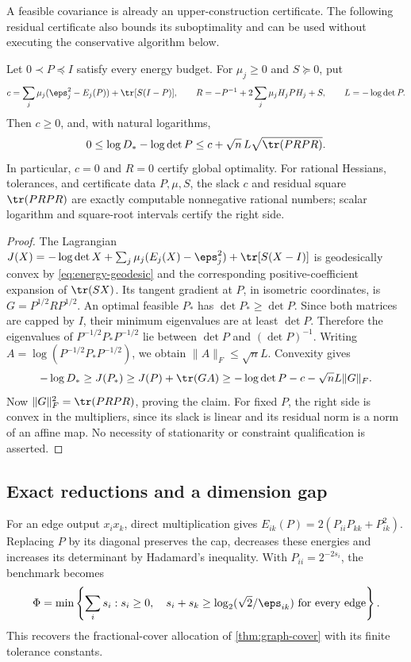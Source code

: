 A feasible covariance is already an upper-construction certificate.
The following residual certificate also bounds its suboptimality and can
be used without executing the conservative algorithm below.
\begin{proposition}\label{prop:covariance-certificate}
Let $0\prec P\preceq I$ satisfy every energy budget. For $\mu_j\ge0$
and $S\succeq0$, put
\[
 c=\sum_j\mu_j(\eps_j^2-E_j(P))+\tr[S(I-P)],\qquad
 R=-P^{-1}+2\sum_j\mu_jH_jPH_j+S,\qquad L=-\log\det P.
\]
Then $c\ge0$, and, with natural logarithms,
\begin{equation}\label{eq:covariance-certificate}
 0\le\log D_* -\log\det P
 \le c+\sqrt n\,L\sqrt{\tr(PRPR)}.
\end{equation}
In particular, $c=0$ and $R=0$ certify global optimality. For rational
Hessians, tolerances, and certificate data $P,\mu,S$, the slack $c$ and
residual square $\tr(PRPR)$ are exactly computable nonnegative rational
numbers; scalar logarithm and square-root intervals certify the right side.
\end{proposition}
\begin{proof}
The Lagrangian
$J(X)=-\log\det X+\sum_j\mu_j(E_j(X)-\eps_j^2)+\tr[S(X-I)]$
is geodesically convex by \eqref{eq:energy-geodesic} and the corresponding
positive-coefficient expansion of $\tr(SX)$. Its tangent gradient at $P$,
in isometric coordinates, is $G=P^{1/2}RP^{1/2}$. An optimal feasible
$P_*$ has $\det P_*\ge\det P$. Since both matrices are capped by $I$,
their minimum eigenvalues are at least $\det P$. Therefore the eigenvalues
of $P^{-1/2}P_*P^{-1/2}$ lie between $\det P$ and $(\det P)^{-1}$.
Writing $A=\log(P^{-1/2}P_*P^{-1/2})$, we obtain
$\|A\|_F\le\sqrt nL$. Convexity gives
\[
 -\log D_*\ge J(P_*)\ge J(P)+\tr(GA)
 \ge-\log\det P-c-\sqrt nL\|G\|_F.
\]
Now $\|G\|_F^2=\tr(PRPR)$, proving the claim. For fixed $P$, the
right side is convex in the multipliers, since its slack is linear and
its residual norm is a norm of an affine map. No necessity of stationarity
or constraint qualification is asserted.
\end{proof}

\subsection{Exact reductions and a dimension gap}

For an edge output $x_ix_k$, direct multiplication gives
$E_{ik}(P)=2(P_{ii}P_{kk}+P_{ik}^2)$. Replacing $P$ by its diagonal
preserves the cap, decreases these energies and increases its determinant
by Hadamard's inequality. With $P_{ii}=2^{-2s_i}$, the benchmark becomes
\begin{equation}\label{eq:covariance-graph-lp}
 \Phi=\min\left\{\sum_i s_i:s_i\ge0,\quad
 s_i+s_k\ge\log_2(\sqrt2/\eps_{ik})\text{ for every edge}\right\}.
\end{equation}
This recovers the fractional-cover allocation of \cref{thm:graph-cover}
with its finite tolerance constants.

